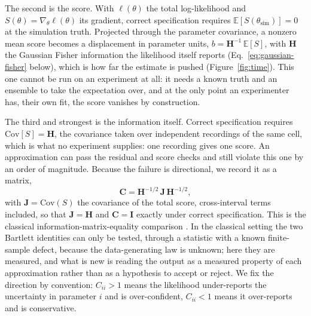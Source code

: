 The second is the score. With $\ell(\theta)$ the total log-likelihood and $S(\theta)=\nabla_\theta\ell(\theta)$ its gradient, correct specification requires $\mathbb{E}[S(\theta_{\mathrm{sim}})]=0$ at the simulation truth. Projected through the parameter covariance, a nonzero mean score becomes a displacement in parameter units, $b=\mathbf{H}^{-1}\,\mathbb{E}[S]$, with $\mathbf{H}$ the Gaussian Fisher information the likelihood itself reports (Eq.~\ref{eq:gaussian-fisher} below), which is how far the estimate is pushed (Figure~\ref{fig:time}). This one cannot be run on an experiment at all: it needs a known truth and an ensemble to take the expectation over, and at the only point an experimenter has, their own fit, the score vanishes by construction.

The third and strongest is the information itself. Correct specification requires $\mathrm{Cov}[S]=\mathbf{H}$, the covariance taken over independent recordings of the same cell, which is what no experiment supplies: one recording gives one score. An approximation can pass the residual and score checks and still violate this one by an order of magnitude. Because the failure is directional, we record it as a matrix,
\[ \mathbf{C}=\mathbf{H}^{-1/2}\,\mathbf{J}\,\mathbf{H}^{-1/2}, \]
with $\mathbf{J}=\mathrm{Cov}(S)$ the covariance of the total score, cross-interval terms included, so that $\mathbf{J}=\mathbf{H}$ and $\mathbf{C}=\mathbf{I}$ exactly under correct specification. This is the classical information-matrix-equality comparison \cite{white1982maximum}. In the classical setting the two Bartlett identities can only be tested, through a statistic with a known finite-sample defect, because the data-generating law is unknown; here they are measured, and what is new is reading the output as a measured property of each approximation rather than as a hypothesis to accept or reject.
We fix the direction by convention: $C_{ii}>1$ means the likelihood under-reports the uncertainty in parameter $i$ and is over-confident, $C_{ii}<1$ means it over-reports and is conservative.


